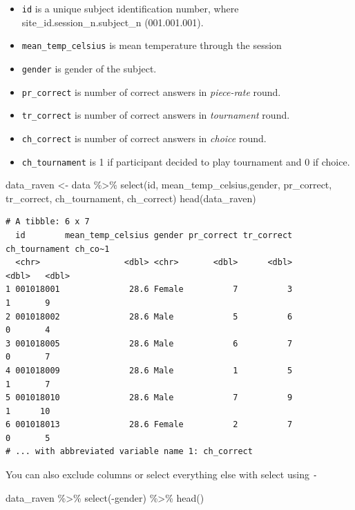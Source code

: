 \documentclass[
  letterpaper,
]{book}
\newenvironment{Shaded}{\begin{snugshade}}{\end{snugshade}}
\newcommand{\FunctionTok}[1]{\textcolor[rgb]{0.28,0.35,0.67}{#1}}
\newcommand{\NormalTok}[1]{\textcolor[rgb]{0.00,0.23,0.31}{#1}}
\newcommand{\OtherTok}[1]{\textcolor[rgb]{0.00,0.23,0.31}{#1}}
\newcommand{\SpecialCharTok}[1]{\textcolor[rgb]{0.37,0.37,0.37}{#1}}
\providecommand{\tightlist}{%
  \setlength{\itemsep}{0pt}\setlength{\parskip}{0pt}}\usepackage{longtable,booktabs,array}
\begin{document}
\begin{itemize}
\tightlist
\item
  \texttt{id} is a unique subject identification number, where
  site\_id.session\_n.subject\_n (001.001.001).
\item
  \texttt{mean\_temp\_celsius} is mean temperature through the session
\item
  \texttt{gender} is gender of the subject.
\item
  \texttt{pr\_correct} is number of correct answers in \emph{piece-rate}
  round.
\item
  \texttt{tr\_correct} is number of correct answers in \emph{tournament}
  round.
\item
  \texttt{ch\_correct} is number of correct answers in \emph{choice}
  round.
\item
  \texttt{ch\_tournament} is 1 if participant decided to play tournament
  and 0 if choice.
\end{itemize}

\begin{Shaded}
\begin{Highlighting}[]
\NormalTok{data\_raven }\OtherTok{\textless{}{-}}\NormalTok{ data }\SpecialCharTok{\%\textgreater{}\%} \FunctionTok{select}\NormalTok{(id, mean\_temp\_celsius,gender, pr\_correct, tr\_correct, ch\_tournament, ch\_correct) }
\FunctionTok{head}\NormalTok{(data\_raven)}
\end{Highlighting}
\end{Shaded}

\begin{verbatim}
# A tibble: 6 x 7
  id        mean_temp_celsius gender pr_correct tr_correct ch_tournament ch_co~1
  <chr>                 <dbl> <chr>       <dbl>      <dbl>         <dbl>   <dbl>
1 001018001              28.6 Female          7          3             1       9
2 001018002              28.6 Male            5          6             0       4
3 001018005              28.6 Male            6          7             0       7
4 001018009              28.6 Male            1          5             1       7
5 001018010              28.6 Male            7          9             1      10
6 001018013              28.6 Female          2          7             0       5
# ... with abbreviated variable name 1: ch_correct
\end{verbatim}

You can also exclude columns or select everything else with select using
\texttt{-}

\begin{Shaded}
\begin{Highlighting}[]
\NormalTok{data\_raven }\SpecialCharTok{\%\textgreater{}\%} \FunctionTok{select}\NormalTok{(}\SpecialCharTok{{-}}\NormalTok{gender) }\SpecialCharTok{\%\textgreater{}\%} \FunctionTok{head}\NormalTok{()}
\end{Highlighting}
\end{Shaded}
\end{document}
